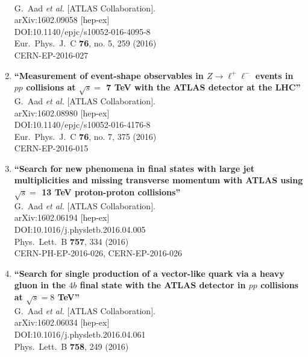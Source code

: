 \documentclass{article}
\begin{document}
\begin{enumerate}
  \\{}G.~Aad {\it et al.} [ATLAS Collaboration].
  \\{}arXiv:1602.09058 [hep-ex]
  \\{}DOI:10.1140/epjc/s10052-016-4095-8
  \\{}Eur.\ Phys.\ J.\ C {\bf 76}, no. 5, 259 (2016)
  \\{}CERN-EP-2016-027
\item%
{\bf ``Measurement of event-shape observables in $Z \rightarrow \ell ^{+} \ell ^{-}$ events in $pp$ collisions at $\sqrt{s}=$ 7 TeV with the ATLAS detector at the LHC''}
  \\{}G.~Aad {\it et al.} [ATLAS Collaboration].
  \\{}arXiv:1602.08980 [hep-ex]
  \\{}DOI:10.1140/epjc/s10052-016-4176-8
  \\{}Eur.\ Phys.\ J.\ C {\bf 76}, no. 7, 375 (2016)
  \\{}CERN-EP-2016-015
\item%
{\bf ``Search for new phenomena in final states with large jet multiplicities and missing transverse momentum with ATLAS using $\sqrt{s} =$ 13 TeV proton-proton collisions''}
  \\{}G.~Aad {\it et al.} [ATLAS Collaboration].
  \\{}arXiv:1602.06194 [hep-ex]
  \\{}DOI:10.1016/j.physletb.2016.04.005
  \\{}Phys.\ Lett.\ B {\bf 757}, 334 (2016)
  \\{}CERN-PH-EP-2016-026, CERN-EP-2016-026
\item%
{\bf ``Search for single production of a vector-like quark via a heavy gluon in the $4b$ final state with the ATLAS detector in $pp$ collisions at $\sqrt{s} = 8$ TeV''}
  \\{}G.~Aad {\it et al.} [ATLAS Collaboration].
  \\{}arXiv:1602.06034 [hep-ex]
  \\{}DOI:10.1016/j.physletb.2016.04.061
  \\{}Phys.\ Lett.\ B {\bf 758}, 249 (2016)

\end{enumerate}
\end{document}
